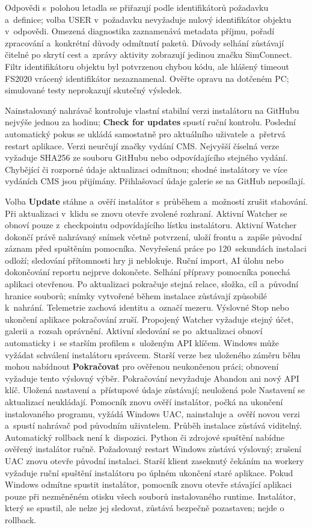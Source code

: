 \documentclass[11pt,a4paper]{article}
\newcommand{\filepath}[1]{\path{#1}}
\newcommand{\ui}[1]{\textbf{#1}}
\begin{document}
Odpovědi s~polohou letadla se přiřazují podle identifikátorů požadavku
a~definice; volba USER v~požadavku nevyžaduje nulový identifikátor objektu
v~odpovědi. Omezená diagnostika zaznamenává metadata příjmu, pořadí zpracování
a~konkrétní důvody odmítnutí paketů. Důvody selhání zůstávají čitelné po skrytí
cest a~zprávy aktivity zobrazují jedinou značku SimConnect. Filtr identifikátoru
objektu byl potvrzenou chybou kódu, ale hlášený timeout FS2020 vrácený
identifikátor nezaznamenal. Ověřte opravu na dotčeném PC; simulované testy
neprokazují skutečný výsledek.

Nainstalovaný nahrávač kontroluje vlastní stabilní verzi instalátoru na GitHubu
nejvýše jednou za hodinu; \ui{Check for updates} spustí ruční kontrolu. Poslední
automatický pokus se ukládá samostatně pro aktuálního uživatele a~přetrvá
restart aplikace. Verzi neurčují značky vydání CMS. Nejvyšší číselná verze
vyžaduje SHA256 ze souboru GitHubu nebo odpovídajícího
\filepath{winapp-update.json} stejného vydání. Chybějící či rozporné údaje
aktualizaci odmítnou; shodné instalátory ve více vydáních CMS jsou přijímány.
Přihlašovací údaje galerie se na GitHub neposílají.

Volba \ui{Update} stáhne a~ověří instalátor s~průběhem a~možností zrušit stahování.
Při aktualizaci v~klidu se znovu otevře zvolené rozhraní. Aktivní Watcher
se obnoví pouze z~checkpointu odpovídajícího lístku instalátoru.
Aktivní Watcher dokončí právě nahrávaný snímek včetně potvrzení, uloží frontu
a~zapíše původní záznam před spuštěním pomocníka. Nevyřešená práce po
120~sekundách instalaci odloží; sledování přítomnosti hry ji neblokuje.
Ruční import, AI úlohu nebo dokončování reportu nejprve dokončete.
Selhání přípravy pomocníka ponechá aplikaci otevřenou. Po aktualizaci pokračuje
stejná relace, složka, cíl a~původní hranice souborů; snímky vytvořené během
instalace zůstávají způsobilé k~nahrání. Telemetrie zachová identitu a~označí
mezeru. Výslovné Stop nebo ukončení aplikace pokračování zruší. Propojený
Watcher vyžaduje stejný účet, galerii a~rozsah oprávnění.
Aktivní sledování se po~aktualizaci obnoví automaticky i~se starším profilem
s~uloženým API klíčem. Windows může vyžádat schválení instalátoru správcem.
Starší verze bez uloženého záměru běhu mohou nabídnout \ui{Pokračovat}
pro ověřenou neukončenou práci; obnovení vyžaduje tento výslovný výběr.
Pokračování nevyžaduje Abandon ani nový API klíč. Uložená nastavení a~přístupové
údaje zůstávají; neuložená pole Nastavení se aktualizací neukládají.
Pomocník znovu ověří instalátor, počká na ukončení instalovaného programu,
vyžádá Windows UAC, nainstaluje a~ověří novou verzi a~spustí nahrávač pod
původním uživatelem. Průběh instalace zůstává viditelný. Automatický rollback
není k~dispozici. Python či zdrojové spuštění nabídne ověřený instalátor ručně.
Požadovaný restart Windows zůstává výslovný; zrušení UAC znovu otevře původní
instalaci. Starší klient zaseknutý čekáním na workery vyžaduje ruční spuštění
instalátoru po úplném ukončení staré aplikace.
Pokud Windows odmítne spustit instalátor, pomocník znovu otevře stávající
aplikaci pouze při nezměněném otisku všech souborů instalovaného runtime. Instalátor,
který se spustil, ale nelze jej sledovat, zůstává bezpečně pozastaven; nejde
o rollback.
\end{document}
